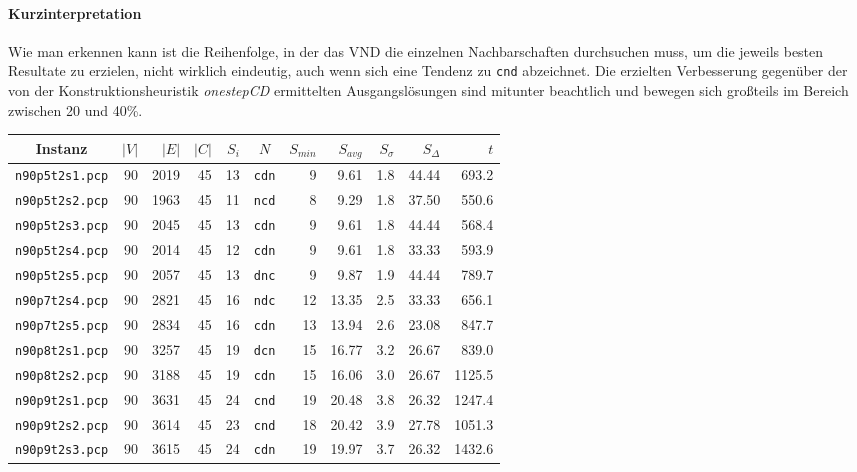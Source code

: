 \paragraph{Kurzinterpretation}{Wie man erkennen kann ist die Reihenfolge, in der das VND die einzelnen Nachbarschaften durchsuchen muss, um die jeweils besten Resultate zu erzielen, nicht wirklich eindeutig, auch wenn sich eine Tendenz zu \texttt{cnd} abzeichnet. Die erzielten Verbesserung gegenüber der von der Konstruktionsheuristik \emph{onestepCD} ermittelten Ausgangslösungen sind mitunter beachtlich und bewegen sich großteils im Bereich zwischen 20 und 40\%.}

\begin{table}[!htbp]
\centering
\begin{tabular}{c|rrr|r|c|rrr|r|r}
Instanz & $|V|$ & $|E|$ & $|C|$ & $S_i$ & $N$ & $S_{min}$ & $S_{avg}$ & $S_{\sigma}$ & $S_{\Delta}$ & $t$ \\
\hline\hline
\texttt{n90p5t2s1.pcp} & 90	& 2019	& 45 & 13 & \texttt{cdn} & 9 & 9.61 & 1.8 & 44.44 & 693.2\\
\texttt{n90p5t2s2.pcp} & 90	& 1963	& 45 & 11 & \texttt{ncd} & 8 & 9.29 & 1.8 & 37.50 & 550.6\\
\texttt{n90p5t2s3.pcp} & 90	& 2045	& 45 & 13 & \texttt{cdn} & 9 & 9.61 & 1.8 & 44.44 & 568.4\\
\texttt{n90p5t2s4.pcp} & 90	& 2014	& 45 & 12 & \texttt{cdn} & 9 & 9.61 & 1.8 & 33.33 & 593.9\\
\texttt{n90p5t2s5.pcp} & 90	& 2057	& 45 & 13 & \texttt{dnc} & 9 & 9.87 & 1.9 & 44.44 & 789.7\\
\texttt{n90p7t2s4.pcp} & 90	& 2821	& 45 & 16 & \texttt{ndc} & 12 & 13.35 & 2.5 & 33.33 & 656.1\\
\texttt{n90p7t2s5.pcp} & 90	& 2834	& 45 & 16 & \texttt{cdn} & 13 & 13.94 & 2.6 & 23.08 & 847.7\\
\texttt{n90p8t2s1.pcp} & 90	& 3257	& 45 & 19 & \texttt{dcn} & 15 & 16.77 & 3.2 & 26.67 & 839.0\\
\texttt{n90p8t2s2.pcp} & 90	& 3188	& 45 & 19 & \texttt{cdn} & 15 & 16.06 & 3.0 & 26.67 & 1125.5\\
\texttt{n90p9t2s1.pcp} & 90	& 3631	& 45	& 24 & \texttt{cnd} & 19 & 20.48 & 3.8 & 26.32 & 1247.4\\
\texttt{n90p9t2s2.pcp} & 90	& 3614	& 45	& 23 & \texttt{cnd} & 18 & 20.42 & 3.9 & 27.78 & 1051.3\\
\texttt{n90p9t2s3.pcp} & 90	& 3615	& 45	& 24 & \texttt{cdn} & 19 & 19.97 & 3.7 & 26.32 & 1432.6\\

\end{tabular}
\end{table}
